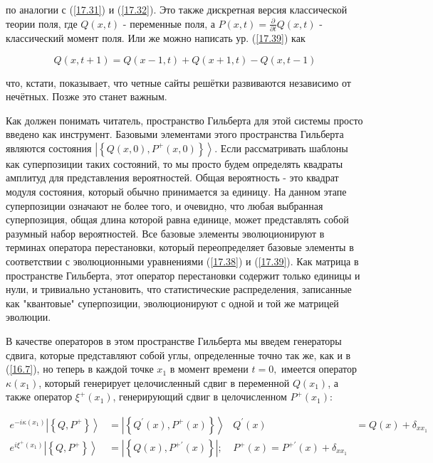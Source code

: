 \documentclass[main.tex]{subfiles}
\begin{document}
по аналогии с (\ref{17.31}) и (\ref{17.32}). Это также дискретная версия классической теории поля, где $Q(x, t)$ - переменные поля, а $P(x, t)=\frac{\partial}{\partial t} Q(x, t)$ - классический момент поля. Или же можно написать ур. (\ref{17.39}) как

\begin{equation}\label{17.40}
Q(x, t+1)=Q(x-1, t)+Q(x+1, t)-Q(x, t-1)
\end{equation}

что, кстати, показывает, что четные сайты решётки развиваются независимо от нечётных. Позже это станет важным.

Как должен понимать читатель, пространство Гильберта для этой системы просто введено как инструмент. Базовыми элементами этого пространства Гильберта являются состояния $\left|\left\{Q(x, 0), P^{+}(x, 0)\right\}\right\rangle$. Если рассматривать шаблоны как суперпозиции таких состояний, то мы просто будем определять квадраты амплитуд для представления вероятностей. Общая вероятность - это квадрат модуля состояния, который обычно принимается за единицу. На данном этапе суперпозиции означают не более того, и очевидно, что любая выбранная суперпозиция, общая длина которой равна единице, может представлять собой разумный набор вероятностей. Все базовые элементы эволюционируют в терминах оператора перестановки, который переопределяет базовые элементы в соответствии с эволюционными уравнениями (\ref{17.38}) и (\ref{17.39}). Как матрица в пространстве Гильберта, этот оператор перестановки содержит только единицы и нули, и тривиально установить, что статистические распределения, записанные как "квантовые" суперпозиции, эволюционируют с одной и той же матрицей эволюции.

В качестве операторов в этом пространстве Гильберта мы введем генераторы сдвига, которые представляют собой углы, определенные точно так же, как и в (\ref{16.7}), но теперь в каждой точке $x_{1}$ в момент времени $t=0,$ имеется оператор $\kappa\left(x_{1}\right)$, который генерирует целочисленный сдвиг в переменной $Q\left(x_{1}\right)$, а также оператор $\xi^{+}\left(x_{1}\right)$, генерирующий сдвиг в целочисленном $P^{+}\left(x_{1}\right)$:

\begin{equation}\label{17.41}
	\begin{aligned} e^{-i \kappa\left(x_{1}\right)}\left|\left\{Q, P^{+}\right\}\right\rangle &=\left|\left\{Q^{\prime}(x), P^{+}(x)\right\}\right\rangle & Q^{\prime}(x) &=Q(x)+\delta_{x x_{1}} \\ e^{i \xi^{+}\left(x_{1}\right)}\left|\left\{Q, P^{+}\right\}\right\rangle &=\left|\left\{Q(x), P^{+\prime}(x)\right\}\right| ; & P^{+}(x)=P^{+\prime}(x)+\delta_{x x_{1}} \end{aligned}
\end{equation}
\end{document}
